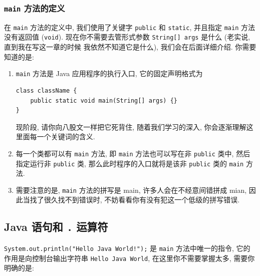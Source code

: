 \documentclass[10pt,UTF8]{book} %
\begin{document}
\subsubsection{\lstinline|main| 方法的定义}

在 \lstinline|main| 方法的定义中, 我们使用了关键字 \lstinline|public| 
和 \lstinline|static|, 并且指定 \lstinline|main| 方法没有返回值 (\lstinline|void|).
现在你不需要去管形式参数 \lstinline|String[] args| 是什么 (老实说, 直到我在写这一章的时候
我依然不知道它是什么), 我们会在后面详细介绍.
你需要知道的是:
\begin{enumerate}
    \item \lstinline|main| 方法是 Java 应用程序的执行入口, 它的固定声明格式为
    \begin{lstlisting}
class className {
    public static void main(String[] args) {}
}
    \end{lstlisting}
    现阶段, 请你向八股文一样把它死背住, 随着我们学习的深入, 你会逐渐理解这里面每一个关键词的含义.
    
    \item 每一个类都可以有 \lstinline|main| 方法,
    即 \lstinline|main| 方法也可以写在非 \lstinline|public| 类中, 然后指定运行非
    \lstinline|public| 类, 那么此时程序的入口就将是该非 \lstinline|public| 
    类的 \lstinline|main| 方法.
    
    \item 需要注意的是, \lstinline|main| 方法的拼写是 main, 许多人会在不经意间错拼成 mian,
    因此当找了很久找不到错误时, 不妨看看你有没有犯这一个低级的拼写错误.
\end{enumerate}


\subsection{Java 语句和 \lstinline|.| 运算符}

\lstinline|System.out.println("Hello Java World!");| 是 \lstinline|main|
方法中唯一的指令, 它的作用是向控制台输出字符串 \lstinline|Hello Java World|,
在这里你不需要掌握太多, 需要你明确的是:
\end{document}
